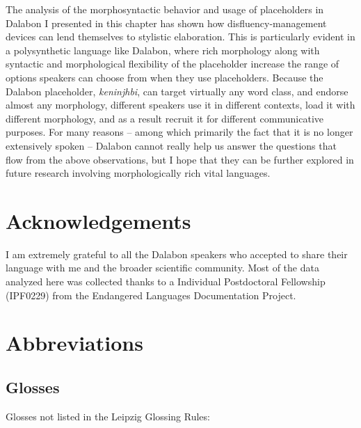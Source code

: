 \documentclass[output=paper]{langscibook}
\begin{document}
The analysis of the morphosyntactic behavior and usage of placeholders in Dalabon I presented in this chapter has shown how disfluency-management devices can lend themselves to stylistic elaboration. This is particularly evident in a polysynthetic language like Dalabon, where rich morphology along with syntactic and morphological flexibility of the placeholder increase the range of options speakers can choose from when they use placeholders. Because the Dalabon placeholder, \textit{keninjhbi}, can target virtually any word class, and endorse almost any morphology, different speakers use it in different contexts, load it with different morphology, and as a result recruit it for different communicative purposes. For many reasons – among which primarily the fact that it is no longer extensively spoken – Dalabon cannot really help us answer the questions that flow from the above observations, but I hope that they can be further explored in future research involving morphologically rich vital languages.

\section*{Acknowledgements}

I am extremely grateful to all the Dalabon speakers who accepted to share their language with me and the broader scientific community. Most of the data analyzed here was collected thanks to a Individual Postdoctoral Fellowship (IPF0229) from the Endangered Languages Documentation Project.

\section*{Abbreviations}

\subsection*{Glosses}
Glosses not listed in the Leipzig Glossing Rules: 
\end{document}
